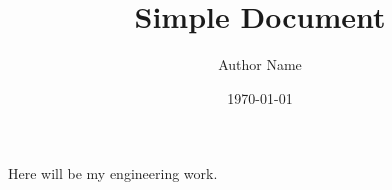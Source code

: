 \documentclass{article}
\begin{document}
\title{Simple Document}
\author{Author Name}
\date{\today}

\maketitle

Here will be my engineering work.
\end{document}
